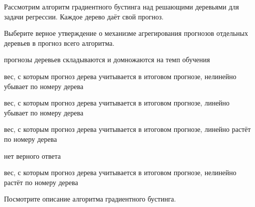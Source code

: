 
\begin{question}
Рассмотрим алгоритм градиентного бустинга над решающими деревьями для задачи регрессии.
Каждое дерево даёт свой прогноз.

Выберите верное утверждение о механизме агрегирования прогнозов отдельных деревьев в прогноз всего алгоритма.
\begin{answerlist}
  \item прогнозы деревьев складываются и домножаются на темп обучения
  \item вес, с которым прогноз дерева учитывается в итоговом прогнозе, нелинейно убывает по номеру дерева
  \item вес, с которым прогноз дерева учитывается в итоговом прогнозе, линейно убывает по номеру дерева
  \item вес, с которым прогноз дерева учитывается в итоговом прогнозе, линейно растёт по номеру дерева
  \item нет верного ответа
  \item вес, с которым прогноз дерева учитывается в итоговом прогнозе, нелинейно растёт по номеру дерева
\end{answerlist}
\end{question}

\begin{solution}
Посмотрите описание алгоритма градиентного бустинга.
\end{solution}


